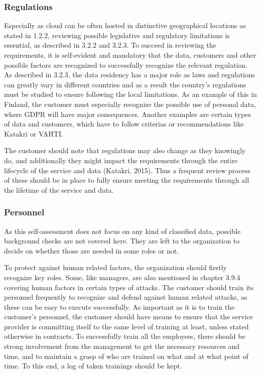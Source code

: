 \documentclass{article}
\begin{document}
\subsubsection{Regulations}
Especially as cloud can be often hosted in distinctive geographical locations as stated in 1.2.2, reviewing possible legislative and regulatory limitations is essential, as described in 3.2.2 and 3.2.3. To succeed in reviewing the requirements, it is self-evident and mandatory that the data, customers and other possible factors are recognized to successfully recognize the relevant regulation. As described in 3.2.3, the data residency has a major role as laws and regulations can greatly vary in different countries and as a result the country's regulations must be studied to ensure following the local limitations. As an example of this in Finland, the customer must especially recognize the possible use of personal data, where GDPR will have major consequences. Another examples are certain types of data and customers, which have to follow criterias or recommendations like Katakri or VAHTI.
\par
The customer should note that regulations may also change as they knowingly do, and additionally they might impact the requirements through the entire lifecycle of the service and data (Katakri, 2015). Thus a frequent review process of these should be in place to fully ensure meeting the requirements through all the lifetime of the service and data.

\subsubsection{Personnel}
As this self-assessment does not focus on any kind of classified data, possible background checks are not covered here. They are left to the organization to decide on whether those are needed in some roles or not.
\par
To protect against human related factors, the organization should firstly recognize key roles. Some, like managers, are also mentioned in chapter 3.9.4 covering human factors in certain types of attacks. The customer should train its personnel frequently to recognize and defend against human related attacks, as these can be easy to execute successfully. As important as it is to train the customer's personnel, the customer should have means to ensure that the service provider is committing itself to the same level of training at least, unless stated otherwise in contracts. To successfully train all the employees, there should be strong involvement from the management to get the necessary resources and time, and to maintain a grasp of who are trained on what and at what point of time. To this end, a log of taken trainings should be kept.
\end{document}
